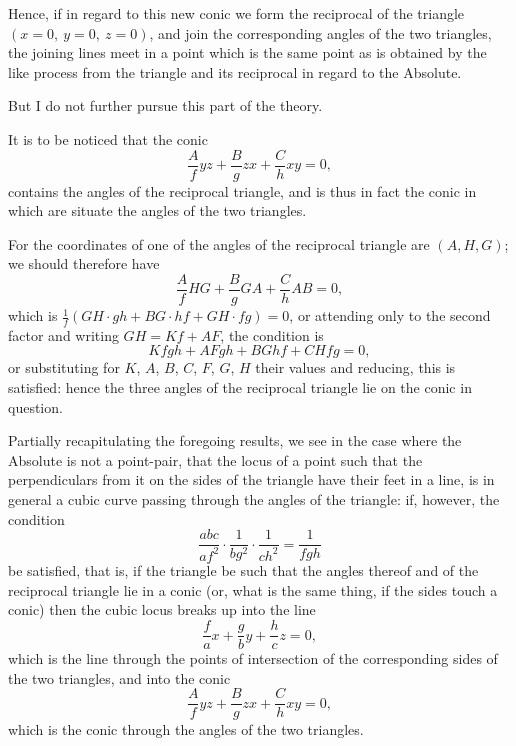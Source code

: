 \documentclass[11pt,a4paper]{article}
\theoremstyle{plain}
\begin{document}
Hence, if in regard to this new conic we form the reciprocal of the triangle $(x = 0,\ y = 0,\ z = 0)$, and join the corresponding angles of the two triangles, the joining lines meet in a point which is the same point as is obtained by the like process from the triangle and its reciprocal in regard to the Absolute.

But I do not further pursue this part of the theory.

It is to be noticed that the conic
\begin{equation}
\frac{A}{f}yz + \frac{B}{g}zx + \frac{C}{h}xy = 0,
\end{equation}
contains the angles of the reciprocal triangle, and is thus in fact the conic in which are situate the angles of the two triangles.

For the coordinates of one of the angles of the reciprocal triangle are $(A, H, G)$; we should therefore have
\begin{equation}
\frac{A}{f}HG + \frac{B}{g}GA + \frac{C}{h}AB = 0,
\end{equation}
which is $\tfrac{1}{f}(GH\cdot gh + BG\cdot hf + GH\cdot fg) = 0$, or attending only to the second factor and writing $GH = Kf + AF$, the condition is
\begin{equation}
Kfgh + AFgh + BGhf + CHfg = 0,
\end{equation}
or substituting for $K$, $A$, $B$, $C$, $F$, $G$, $H$ their values and reducing, this is satisfied: hence the three angles of the reciprocal triangle lie on the conic in question.

\newpage
\setcounter{equation}{12}

Partially recapitulating the foregoing results, we see in the case where the Absolute is not a point-pair, that the locus of a point such that the perpendiculars from it on the sides of the triangle have their feet in a line, is in general a cubic curve passing through the angles of the triangle: if, however, the condition
\begin{equation}
\frac{abc}{af^2} \cdot \frac{1}{bg^2} \cdot \frac{1}{ch^2} = \frac{1}{fgh}
\end{equation}
be satisfied, that is, if the triangle be such that the angles thereof and of the reciprocal triangle lie in a conic (or, what is the same thing, if the sides touch a conic) then the cubic locus breaks up into the line
\begin{equation}
\frac{f}{a}x + \frac{g}{b}y + \frac{h}{c}z = 0,
\end{equation}
which is the line through the points of intersection of the corresponding sides of the two triangles, and into the conic
\begin{equation}
\frac{A}{f}yz + \frac{B}{g}zx + \frac{C}{h}xy = 0,
\end{equation}
which is the conic through the angles of the two triangles.
\end{document}

